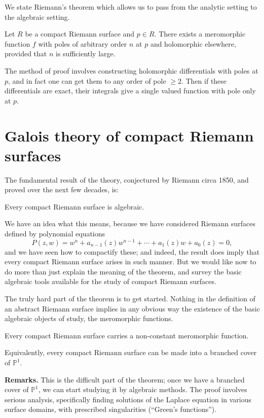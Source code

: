 \documentclass[12pt]{article}
\begin{document}
We state Riemann's theorem which allows us to pass from the analytic setting to the algebraic setting.
\begin{theorem}
    Let $R$ be a compact Riemann surface and $p\in R$. There exists a meromorphic function $f$ with poles of arbitrary order $n$ at $p$ and holomorphic elsewhere, provided that $n$ is sufficiently large.
\end{theorem}

The method of proof involves constructing holomorphic differentials with poles at $p$, and in fact one can get them to any order of pole $\geq 2$. Then if these differentials are exact, their integrals give a single valued function with pole only at $p$.
\section{Galois theory of compact Riemann surfaces}

The fundamental result of the theory, conjectured by Riemann circa 1850, and proved over the next few decades, is:

\begin{theorem}
Every compact Riemann surface is algebraic.
\end{theorem}

We have an idea what this means, because we have considered Riemann surfaces defined by polynomial equations
\[
P(z,w) = w^n + a_{n-1}(z)w^{n-1} + \cdots + a_1(z)w + a_0(z) = 0,
\]
and we have seen how to compactify these; and indeed, the result does imply that every compact Riemann surface arises in such manner.  
But we would like now to do more than just explain the meaning of the theorem, and survey the basic algebraic tools available for the study of compact Riemann surfaces.

The truly hard part of the theorem is to get started.  Nothing in the definition of an abstract Riemann surface implies in any obvious way the existence of the basic algebraic objects of study, the meromorphic functions.

\begin{theorem}
Every compact Riemann surface carries a non-constant meromorphic function.
\end{theorem}

Equivalently, every compact Riemann surface can be made into a branched cover of $\mathbb{P}^1$.

\medskip
\noindent
\textbf{Remarks.}  
This is the difficult part of the theorem; once we have a branched cover of $\mathbb{P}^1$, we can start studying it by algebraic methods.  
The proof involves serious analysis, specifically finding solutions of the Laplace equation in various surface domains, with prescribed singularities (“Green’s functions”).
\end{document}
